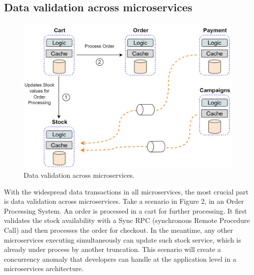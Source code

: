 \documentclass[a4paper,12pt]{article}
\begin{document}
\subsection{Data validation across microservices}
\begin{figure}[h!]
    \begin{center}
	    \includegraphics[width=0.7\columnwidth]{img/validation.png}
    \end{center}
	\caption{Data validation across microservices.}
	\label{fig:microarch}
\end{figure}
With the widespread data transactions in all microservices, the most crucial part is data validation across microservices. Take a scenario in Figure 2, in an Order Processing System. An order is processed in a cart for further processing. \cite{cite-34} It first validates the stock availability with a Sync RPC (synchronous Remote Procedure Call) and then processes the order for checkout. In the meantime, any other microservices executing simultaneously can update such stock service, which is already under process by another truncation. This scenario will create a concurrency anomaly that developers can handle at the application level in a microservices architecture. \cite{one, three, seven, twelve}


 
\end{document}
